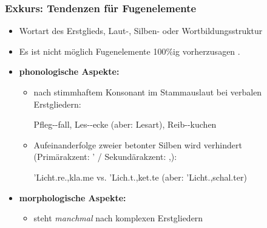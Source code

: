\begin{frame}
\frametitle{Exkurs: Tendenzen für Fugenelemente}

\begin{itemize}
	\item Wortart des Erstglieds, Laut-, Silben- oder Wortbildungsstruktur 
	
	\item Es ist nicht möglich Fugenelemente 100\%ig vorherzusagen \citep[vgl.][]{Fuhrhop96a}.

\pause
	
	\item \textbf{phonologische Aspekte:}
	
	\begin{itemize}
		\item \textipa{[@]} nach stimmhaftem Konsonant im Stammauslaut bei verbalen Erstgliedern:
		
		\ea Pfleg--fall, Les--ecke (aber: Lesart), Reib--kuchen
		\z
		
		\item Aufeinanderfolge zweier betonter Silben wird verhindert\\
		(Primärakzent: ' / Sekundärakzent: ,):
		
		\ea 'Licht.\alertred{\_}re.,kla.me vs. 'Lich.t.,ket.te (aber: 'Licht\alertred{\_}.,schal.ter)
		\z
			
	\end{itemize}

\pause 

	\item \textbf{morphologische Aspekte:}
	
	\begin{itemize}
		\item {} steht \emph{manchmal} nach komplexen Erstgliedern

		\z 
	\end{itemize}

\end{itemize}

\end{frame}


